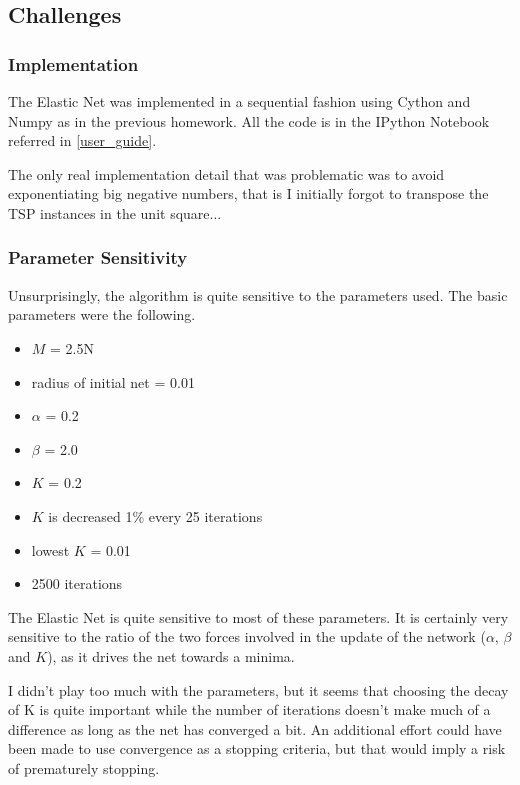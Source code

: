 \documentclass{article} %
\begin{document}
\subsection{Challenges}

\subsubsection{Implementation}
The Elastic Net was implemented in a sequential fashion using Cython and Numpy as in the previous homework. All the code is in the IPython Notebook referred in \cref{user_guide}.\newline

The only real implementation detail that was problematic was to avoid exponentiating big negative numbers, that is I initially forgot to transpose the TSP instances in the unit square...


\subsubsection{Parameter Sensitivity}

Unsurprisingly, the algorithm is quite sensitive to the parameters used. The basic parameters were the following.

\begin{itemize}
	\item $M$ = 2.5N
	\item radius of initial net = 0.01
	\item $\alpha$ = 0.2
	\item $\beta$ = 2.0
	\item $K$ = 0.2
	\item $K$ is decreased 1\% every 25 iterations
	\item lowest $K$ = 0.01
	\item 2500 iterations
\end{itemize}

The Elastic Net is quite sensitive to most of these parameters. It is certainly very sensitive to the ratio of the two forces involved in the update of the network ($\alpha$, $\beta$ and $K$), as it drives the net towards a minima.\newline

I didn't play too much with the parameters, but it seems that choosing the decay of K is quite important while the number of iterations doesn't make much of a difference as long as the net has converged a bit. An additional effort could have been made to use convergence as a stopping criteria, but that would imply a risk of prematurely stopping.
\end{document}
